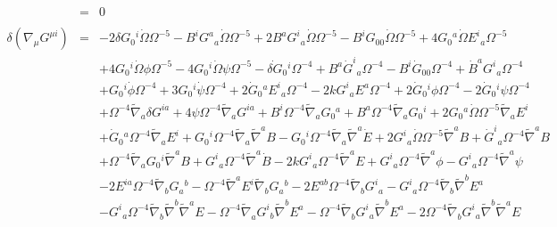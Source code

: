 \documentclass[10pt,letterpaper]{article}
\numberwithin{equation}{section}
\begin{document}
\begin{eqnarray}
\\  \nonumber\\ 
&=&0
\\  \nonumber\\ 
\delta(\nabla_\mu G^{\mu i})&=& -2 \delta G_{0}{}^{i} \dot{\Omega} \Omega^{-5} -  B^{i} G^{a}{}_{a} \dot{\Omega} \Omega^{-5} + 2 B^{a} G^{i}{}_{a} \dot{\Omega} \Omega^{-5} -  B^{i} G_{00}{} \dot{\Omega} \Omega^{-5} + 4 G_{0}{}^{a} \dot{\Omega} E^{i}{}_{a} \Omega^{-5} \nonumber \\ 
&& + 4 G_{0}{}^{i} \dot{\Omega} \phi \Omega^{-5} - 4 G_{0}{}^{i} \dot{\Omega} \psi \Omega^{-5} -  \dot{\delta G}_{0}{}^{i} \Omega^{-4} + B^{a} \dot{G}^{i}{}_{a} \Omega^{-4} -  B^{i} \dot{G}_{00}{} \Omega^{-4} + \dot{B}^{a} G^{i}{}_{a} \Omega^{-4} \nonumber \\ 
&& + G_{0}{}^{i} \dot{\phi} \Omega^{-4} + 3 G_{0}{}^{i} \dot{\psi} \Omega^{-4} + 2 \dot{G}_{0}{}^{a} E^{i}{}_{a} \Omega^{-4} - 2 k G^{i}{}_{a} E^{a} \Omega^{-4} + 2 \dot{G}_{0}{}^{i} \phi \Omega^{-4} - 2 \dot{G}_{0}{}^{i} \psi \Omega^{-4} \nonumber \\ 
&& + \Omega^{-4} \tilde{\nabla}_{a}\delta G^{ia} + 4 \psi \Omega^{-4} \tilde{\nabla}_{a}G^{ia} + B^{i} \Omega^{-4} \tilde{\nabla}_{a}G_{0}{}^{a} + B^{a} \Omega^{-4} \tilde{\nabla}_{a}G_{0}{}^{i} + 2 G_{0}{}^{a} \dot{\Omega} \Omega^{-5} \tilde{\nabla}_{a}E^{i} \nonumber \\ 
&& + \dot{G}_{0}{}^{a} \Omega^{-4} \tilde{\nabla}_{a}E^{i} + G_{0}{}^{i} \Omega^{-4} \tilde{\nabla}_{a}\tilde{\nabla}^{a}B -  G_{0}{}^{i} \Omega^{-4} \tilde{\nabla}_{a}\tilde{\nabla}^{a}\dot{E} + 2 G^{i}{}_{a} \dot{\Omega} \Omega^{-5} \tilde{\nabla}^{a}B + \dot{G}^{i}{}_{a} \Omega^{-4} \tilde{\nabla}^{a}B \nonumber \\ 
&& + \Omega^{-4} \tilde{\nabla}_{a}G_{0}{}^{i} \tilde{\nabla}^{a}B + G^{i}{}_{a} \Omega^{-4} \tilde{\nabla}^{a}\dot{B} - 2 k G^{i}{}_{a} \Omega^{-4} \tilde{\nabla}^{a}E + G^{i}{}_{a} \Omega^{-4} \tilde{\nabla}^{a}\phi -  G^{i}{}_{a} \Omega^{-4} \tilde{\nabla}^{a}\psi \nonumber \\ 
&& - 2 E^{ia} \Omega^{-4} \tilde{\nabla}_{b}G_{a}{}^{b} -  \Omega^{-4} \tilde{\nabla}^{a}E^{i} \tilde{\nabla}_{b}G_{a}{}^{b} - 2 E^{ab} \Omega^{-4} \tilde{\nabla}_{b}G^{i}{}_{a} -  G^{i}{}_{a} \Omega^{-4} \tilde{\nabla}_{b}\tilde{\nabla}^{b}E^{a} \nonumber \\ 
&& -  G^{i}{}_{a} \Omega^{-4} \tilde{\nabla}_{b}\tilde{\nabla}^{b}\tilde{\nabla}^{a}E -  \Omega^{-4} \tilde{\nabla}_{a}G^{i}{}_{b} \tilde{\nabla}^{b}E^{a} -  \Omega^{-4} \tilde{\nabla}_{b}G^{i}{}_{a} \tilde{\nabla}^{b}E^{a} - 2 \Omega^{-4} \tilde{\nabla}_{b}G^{i}{}_{a} \tilde{\nabla}^{b}\tilde{\nabla}^{a}E \nonumber \\ 

\end{eqnarray}
\end{document}
